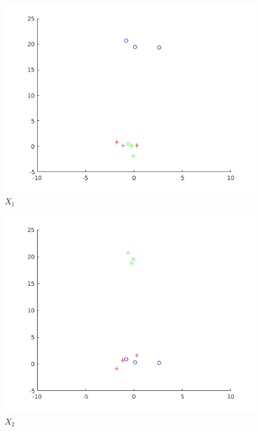 \begin{figure}
\includegraphics[width=\linewidth]{X_1.png}
\caption{$X_1$}
\label{img:X_1}
\end{figure}

\begin{figure}
\includegraphics[width=\linewidth]{X_2.png}
\caption{$X_2$}
\label{img:X_2}
\end{figure}




